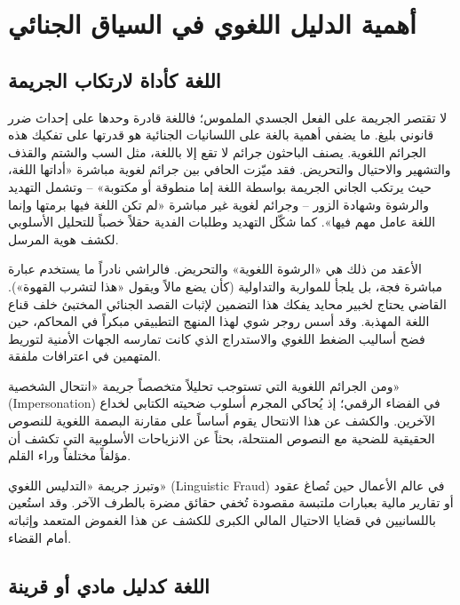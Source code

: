 \section{أهمية الدليل اللغوي في السياق الجنائي}

\subsection{اللغة كأداة لارتكاب الجريمة}

لا تقتصر الجريمة على الفعل الجسدي الملموس؛ فاللغة قادرة وحدها على إحداث ضرر قانوني بليغ. ما يضفي أهمية بالغة على اللسانيات الجنائية هو قدرتها على تفكيك هذه الجرائم اللغوية. يصنف الباحثون جرائم لا تقع إلا باللغة، مثل السب والشتم والقذف والتشهير والاحتيال والتحريض. فقد ميّزت الحافي بين جرائم لغوية مباشرة «أداتها اللغة، حيث يرتكب الجاني الجريمة بواسطة اللغة إما منطوقة أو مكتوبة» -- وتشمل التهديد والرشوة وشهادة الزور -- وجرائم لغوية غير مباشرة «لم تكن اللغة فيها برمتها وإنما اللغة عامل مهم فيها»\autocite[14]{alhafi2023}. كما شكّل التهديد وطلبات الفدية حقلاً خصباً للتحليل الأسلوبي لكشف هوية المرسل\autocite[54]{taaba2022}.

الأعقد من ذلك هي «الرشوة اللغوية» والتحريض. فالراشي نادراً ما يستخدم عبارة مباشرة فجة، بل يلجأ للمواربة والتداولية (كأن يضع مالاً ويقول «هذا لتشرب القهوة»). القاضي يحتاج لخبير محايد يفكك هذا التضمين لإثبات القصد الجنائي المختبئ خلف قناع اللغة المهذبة. وقد أسس روجر شوي لهذا المنهج التطبيقي مبكراً في المحاكم، حين فضح أساليب الضغط اللغوي والاستدراج الذي كانت تمارسه الجهات الأمنية لتوريط المتهمين في اعترافات ملفقة\autocite[34]{alassimi2018}.

ومن الجرائم اللغوية التي تستوجب تحليلاً متخصصاً جريمة «انتحال الشخصية» (\textenglish{Impersonation}) في الفضاء الرقمي؛ إذ يُحاكي المجرم أسلوب ضحيته الكتابي لخداع الآخرين. والكشف عن هذا الانتحال يقوم أساساً على مقارنة البصمة اللغوية للنصوص الحقيقية للضحية مع النصوص المنتحلة، بحثاً عن الانزياحات الأسلوبية التي تكشف أن مؤلفاً مختلفاً وراء القلم.

وتبرز جريمة «التدليس اللغوي» (\textenglish{Linguistic Fraud}) في عالم الأعمال حين تُصاغ عقود أو تقارير مالية بعبارات ملتبسة مقصودة تُخفي حقائق مضرة بالطرف الآخر. وقد استُعين باللسانيين في قضايا الاحتيال المالي الكبرى للكشف عن هذا الغموض المتعمد وإثباته أمام القضاء.

\subsection{اللغة كدليل مادي أو قرينة}

